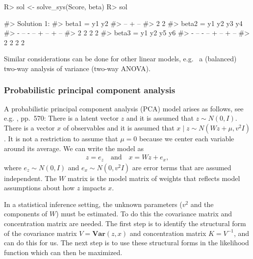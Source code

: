 \begin{Schunk}
\begin{Sinput}
R> sol <- solve_sys(Score, beta)
R> sol
\end{Sinput}
\begin{Soutput}
#> Solution 1:
#>   beta1 =  y1   y2
#>           -- + --
#>           2    2 
#>   beta2 =    y1   y2   y3   y4
#>           - -- - -- + -- + --
#>             2    2    2    2 
#>   beta3 =    y1   y2   y5   y6
#>           - -- - -- + -- + --
#>             2    2    2    2
\end{Soutput}
\end{Schunk}

Similar considerations can be done for other linear models, e.g.~ a
(balanced) two-way analysis of variance (two-way ANOVA).

\hypertarget{probabilistic-principal-component-analysis}{%
\subsubsection{Probabilistic principal component
analysis}\label{probabilistic-principal-component-analysis}}

A probabilistic principal component analysis (PCA) model arises as
follows, see e.g. \citet{bishop:06}, pp.~570: There is a latent vector
\(z\) and it is assumed that \(z\sim N(0,I)\). There is a vector \(x\)
of observables and it is assumed that
\(x \mid z \sim N(Wz + \mu, v^2I)\). It is not a restriction to assume
that \(\mu=0\) because we center each variable around its average. We
can write the model as \begin{align} \label{eq:ppca-model}
z = e_z \quad \text{and} \quad
x = Wz + e_x, 
\end{align} where \(e_z \sim N(0,I)\) and \(e_x\sim N(0,v^2I)\) are
error terms that are assumed independent. The \(W\) matrix is the model
matrix of weights that reflects model assumptions about how \(z\)
impacts \(x\).

In a statistical inference setting, the unknown parameters (\(v^2\) and
the components of \(W\)) must be estimated. To do this the covariance
matrix and concentration matrix are needed. The first step is to
identify the structural form of the covariance matrix
\(V=\mathbf{Var}(z,x)\) and concentration matrix \(K=V^{-1}\), and
 can do this for us. The next step is to use these
structural forms in the likelihood function which can then be maximized.

